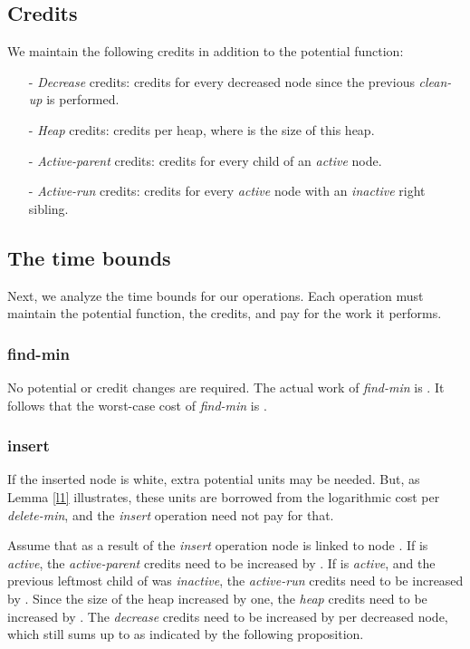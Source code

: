 \subsection{Credits}

We maintain the following credits in addition to the potential function:

\begin{enumerate}
\item [-] {\it Decrease} credits:  credits for every decreased node since the previous {\it clean-up} is performed. 
\item [-] {\it Heap} credits:  credits per heap, where  is the size of this heap.
\item [-] {\it Active-parent} credits:  credits for every child of an {\it active} node.
\item [-] {\it Active-run} credits:  credits for every {\it active} node with an {\it inactive} right sibling. 
\end{enumerate}

\subsection{The time bounds}

Next, we analyze the time bounds for our operations. Each operation must maintain the potential function, the credits, and pay for the work it performs.

 
\subsubsection{find-min}
No potential or credit changes are required. The actual work of {\it find-min} is . It follows that the worst-case cost of {\it find-min} is .

\subsubsection{insert} 

If the inserted node is white, extra potential units may be needed. But, as Lemma \ref{l1} illustrates, these units are borrowed from the logarithmic cost per {\it delete-min}, and the {\it insert} operation need not pay for that. 

Assume that as a result of the {\it insert} operation node  is linked to node . If  is {\it active}, the {\it active-parent} credits need to be increased by . If  is {\it active}, and the previous leftmost child of  was {\it inactive}, the {\it active-run} credits need to be increased by . Since the size of the heap increased by one, the {\it heap} credits need to be increased by . The {\it decrease} credits need to be increased by  per decreased node, which still sums up to  as indicated by the following proposition.


